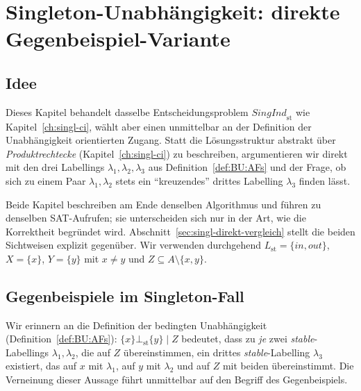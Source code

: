 \chapter{Singleton-Unabhängigkeit: direkte Gegenbeispiel-Variante}
\label{ch:singl-ci-direkt}

\section{Idee}
\label{sec:singl-direkt-idee}

Dieses Kapitel behandelt dasselbe Entscheidungsproblem
\(\textit{SingInd}_{\mathrm{st}}\) wie Kapitel~\ref{ch:singl-ci}, wählt aber
einen unmittelbar an der Definition der Unabhängigkeit orientierten Zugang.
Statt die Lösungsstruktur abstrakt über \emph{Produktrechtecke}
(Kapitel~\ref{ch:singl-ci}) zu beschreiben, argumentieren wir direkt mit den
drei Labellings \(\lambda_1,\lambda_2,\lambda_3\) aus
Definition~\ref{def:BU:AFs} und der Frage, ob sich zu einem Paar
\(\lambda_1,\lambda_2\) stets ein ``kreuzendes'' drittes Labelling
\(\lambda_3\) finden lässt.

Beide Kapitel beschreiben am Ende denselben Algorithmus und führen zu
denselben SAT-Aufrufen; sie unterscheiden sich nur in der Art, wie die
Korrektheit begründet wird. Abschnitt~\ref{sec:singl-direkt-vergleich} stellt
die beiden Sichtweisen explizit gegenüber. Wir verwenden durchgehend
\(L_{\mathrm{st}}=\{\mathit{in},\mathit{out}\}\), \(X=\{x\}\), \(Y=\{y\}\) mit
\(x\neq y\) und \(Z\subseteq A\setminus\{x,y\}\).

\section{Gegenbeispiele im Singleton-Fall}
\label{sec:singl-direkt-gegenbsp}

Wir erinnern an die Definition der bedingten Unabhängigkeit
(Definition~\ref{def:BU:AFs}): \(\{x\}\bot_{\mathrm{st}}\{y\}\mid Z\) bedeutet,
dass zu \emph{je} zwei \textit{stable}-Labellings \(\lambda_1,\lambda_2\), die
auf \(Z\) übereinstimmen, ein drittes \textit{stable}-Labelling \(\lambda_3\)
existiert, das auf \(x\) mit \(\lambda_1\), auf \(y\) mit \(\lambda_2\) und auf
\(Z\) mit beiden übereinstimmt. Die Verneinung dieser Aussage führt
unmittelbar auf den Begriff des Gegenbeispiels.

